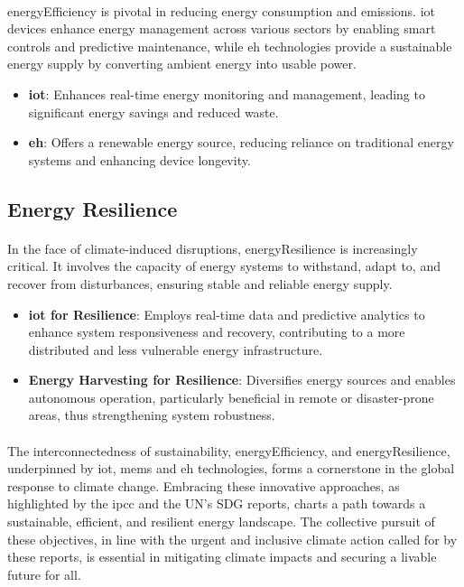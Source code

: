    \paragraph{}
    \gls{energyEfficiency} is pivotal in reducing energy consumption and emissions. \gls{iot} devices enhance energy management across various sectors by enabling smart controls and predictive maintenance, while \gls{eh} technologies provide a sustainable energy supply by converting ambient energy into usable power.
    \begin{itemize}
        \item \textbf{\gls{iot}}: Enhances real-time energy monitoring and management, leading to significant energy savings and reduced waste\cite{HAFEZ2023101013}.
        \item \textbf{\gls{eh}}: Offers a renewable energy source, reducing reliance on traditional energy systems and enhancing device longevity\cite{LIU2023113436}.
    \end{itemize}

\subsection{Energy Resilience}

    \paragraph{}
    In the face of climate-induced disruptions, \gls{energyResilience} is increasingly critical. It involves the capacity of energy systems to withstand, adapt to, and recover from disturbances, ensuring stable and reliable energy supply\cite{iotSustainableEnergySystems}.
    \begin{itemize}
        \item \textbf{\gls{iot} for Resilience}: Employs real-time data and predictive analytics to enhance system responsiveness and recovery, contributing to a more distributed and less vulnerable energy infrastructure\cite{gameboyBatteryless}.
        \item \textbf{Energy Harvesting for Resilience}: Diversifies energy sources and enables autonomous operation, particularly beneficial in remote or disaster-prone areas, thus strengthening system robustness\cite{memsEHforIot}.
    \end{itemize}

\paragraph{}
The interconnectedness of \gls{sustainability}, \gls{energyEfficiency}, and \gls{energyResilience}, underpinned by \gls{iot}, \gls{mems} and \gls{eh} technologies, forms a cornerstone in the global response to climate change. Embracing these innovative approaches, as highlighted by the \gls{ipcc} and the UN's SDG reports, charts a path towards a sustainable, efficient, and resilient energy landscape. The collective pursuit of these objectives, in line with the urgent and inclusive climate action called for by these reports, is essential in mitigating climate impacts and securing a livable future for all.

